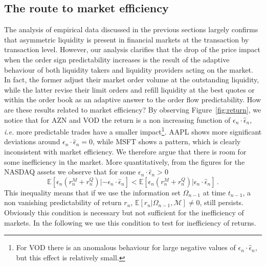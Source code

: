 \documentclass[12pt]{iopart}
\begin{document}
\subsection{The route to market efficiency}
The analysis of empirical data discussed in the previous sections largely confirms that asymmetric liquidity is present in financial markets at the transaction by transaction level. However, our analysis clarifies that the drop of the price impact when the order sign predictability increases is the result of the adaptive behaviour of both liquidity takers and liquidity providers acting on the market. In fact, the former adjust their market order volume at the outstanding liquidity, while the latter revise their limit orders and refill liquidity at the best quotes or within the order book as an adaptive answer to the order flow predictability. How are these results related to market efficiency? By observing Figure~\ref{fig:return}, we notice that for AZN and VOD the return is a non increasing function of $\epsilon_n\cdot\hat{\epsilon}_n$, \emph{i.e.} more predictable trades have a smaller impact\footnote{For VOD there is an anomalous behaviour for large negative values of $\epsilon_n\cdot\hat{\epsilon}_n$, but this effect is relatively small.}. AAPL shows more significant deviations around $\epsilon_n\cdot\hat{\epsilon}_n=0$, while MSFT shows a pattern, which is clearly inconsistent with market efficiency. We therefore argue that there is room for some inefficiency in the market. More quantitatively, from the figures for the NASDAQ assets we observe that for some $\epsilon_n\cdot\hat{\epsilon}_n>0$
\begin{equation}
\mathbb{E}[\epsilon_n(r_n^M+r_n^Q)|-\epsilon_n\cdot\hat{\epsilon}_n]<\mathbb{E}[\epsilon_n(r_n^M+r_n^Q)|\epsilon_n\cdot\hat{\epsilon}_n]\,. \label{eqn:cond_inefficiency}
\end{equation}
This inequality means that if we use the information set $\Omega_{n-1}$ at time $t_{n-1}$, a non vanishing predictability of return $r_n$, $\mathbb{E}[r_n|\Omega_{n-1}, \mathcal{M}] \neq 0$, still persists. Obviously this condition is necessary but not sufficient for the inefficiency of markets. In the following we use this condition to test for inefficiency of returns.
\end{document}
